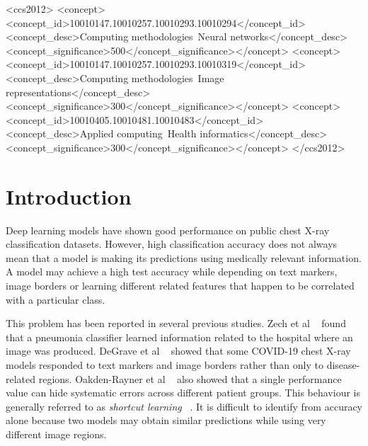 \documentclass[sigconf,screen,nonacm]{acmart}
\begin{document}
\begin{CCSXML}
<ccs2012>
<concept><concept_id>10010147.10010257.10010293.10010294</concept_id><concept_desc>Computing methodologies~Neural networks</concept_desc><concept_significance>500</concept_significance></concept>
<concept><concept_id>10010147.10010257.10010293.10010319</concept_id><concept_desc>Computing methodologies~Image representations</concept_desc><concept_significance>300</concept_significance></concept>
<concept><concept_id>10010405.10010481.10010483</concept_id><concept_desc>Applied computing~Health informatics</concept_desc><concept_significance>300</concept_significance></concept>
</ccs2012>
\end{CCSXML}


\maketitle

\section{Introduction}

Deep learning models have shown good performance on public chest X-ray classification datasets. However, high classification accuracy does not always mean that a model is making its predictions using medically relevant information. A model may achieve a high test accuracy while depending on text markers, image borders or learning different related features that happen to be correlated with a particular class.

This problem has been reported in several previous studies. Zech et al ~\cite{zech2018variable} found that a pneumonia classifier learned information related to the hospital where an image was produced. DeGrave et al ~\cite{degrave2021shortcuts} showed that some COVID-19 chest X-ray models responded to text markers and image borders rather than only to disease-related regions. Oakden-Rayner et al ~\cite{oakdenrayner2020hidden} also showed that a single performance value can hide systematic errors across different patient groups. This behaviour is generally referred to as \emph{shortcut learning} ~\cite{geirhos2020shortcut}. It is difficult to identify from accuracy alone because two models may obtain similar predictions while using very different image regions.
\end{document}
